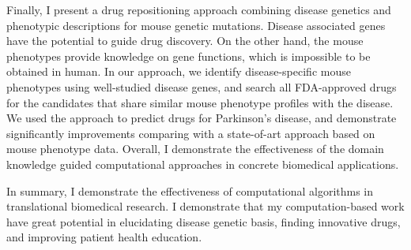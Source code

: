 Finally, I present a drug repositioning approach combining disease genetics and phenotypic descriptions for mouse genetic mutations. Disease associated genes have the potential to guide drug discovery. On the other hand, the mouse phenotypes provide knowledge on gene functions, which is impossible to be obtained in human. In our approach, we identify disease-specific mouse phenotypes using well-studied disease genes, and search all FDA-approved drugs for the candidates that share similar mouse phenotype profiles with the disease. We used the approach to predict drugs for Parkinson's disease, and demonstrate significantly improvements comparing with a state-of-art approach based on mouse phenotype data. Overall, I demonstrate the effectiveness of the domain knowledge guided computational approaches in concrete biomedical applications.

In summary, I demonstrate the effectiveness of computational algorithms in translational biomedical research. I demonstrate that my computation-based work have great potential in elucidating disease genetic basis, finding innovative drugs, and improving patient health education.






